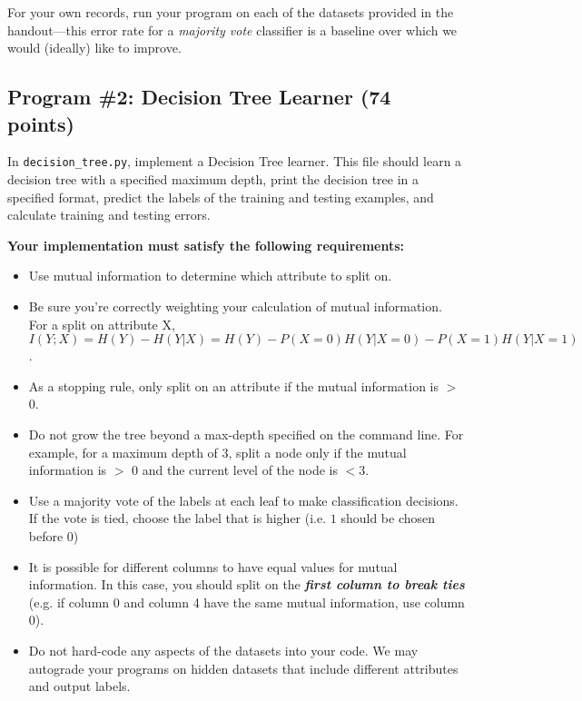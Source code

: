 \documentclass[11pt,addpoints,answers]{exam}
\begin{document}
\begin{notebox}
For your own records, run your program on each of the datasets provided in the handout---this error rate for a \emph{majority vote} classifier is a baseline over which we would (ideally) like to improve.
\end{notebox}

\subsection{Program \#2: Decision Tree Learner (74 points)}
\label{sec:decisiontree}

In \texttt{decision\_tree.py}, implement a Decision Tree learner. This file should learn a decision tree with a specified maximum depth, print the decision tree in a specified format, predict the labels of the training and testing examples, and calculate training and testing errors.

\textbf{Your implementation must satisfy the following requirements:}
\begin{itemize}
\item Use mutual information to determine which attribute to split on.
\item Be sure you’re correctly weighting your calculation of mutual information. For a split on attribute X, $I(Y;X) = H(Y)-H(Y|X) = H(Y) - P(X=0)H(Y|X = 0) - P(X = 1)H(Y|X = 1)$.
\item As a stopping rule, only split on an attribute if the mutual information is $>$ 0. 
\item Do not grow the tree beyond a max-depth specified on the command line. For example, for a maximum depth of 3, split a node only if the mutual information is $>$ 0 and the current level of the node is $< 3$.
\item Use a majority vote of the labels at each leaf to make classification decisions. If the vote is tied, choose the label that is higher (i.e. $1$ should be chosen before $0$)
\item It is possible for different columns to have equal values for mutual information. In this case, you should split on the \emph{\textbf{first column to break ties}} (e.g. if column 0 and column 4 have the same mutual information, use column 0).
\item Do not hard-code any aspects of the datasets into your code. We may autograde your programs on hidden datasets that include different attributes and output labels.
\end{itemize}
\end{document}
